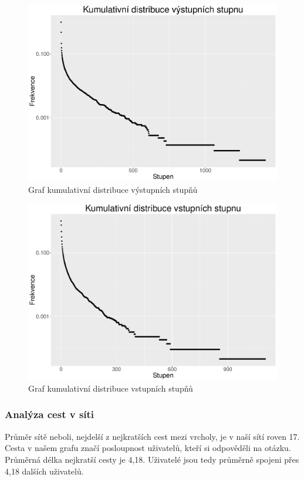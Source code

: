 \documentclass[a4paper,12pt]{article}
\begin{document}
\begin{figure}[h!]
\centering
\includegraphics[scale=0.4]{images/out_deg_cum.pdf}
\caption{Graf kumulativní distribuce výstupních stupňů}
\label{img:out_deg_cum}
\end{figure}

\begin{figure}[h!!]
\centering
\includegraphics[scale=0.4]{images/in_deg_cum.pdf}
\caption{Graf kumulativní distribuce vstupních stupňů}
\label{img:in_deg_cum}
\end{figure}

\FloatBarrier


\newpage
\subsubsection{Analýza cest v síti}
Průměr sítě neboli, nejdelší z nejkratších cest mezi vrcholy, je v naší sítí roven 17. 
Cesta v našem grafu značí posloupnost uživatelů, kteří si odpověděli na otázku. Průměrná délka nejkratší cesty je 4,18. Uživatelé jsou tedy průměrně spojeni přes 4,18 dalších uživatelů.
\end{document}
